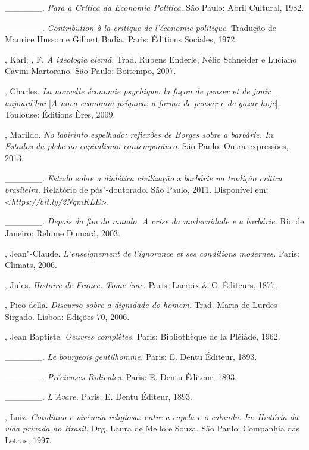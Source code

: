 \begin{Parskip}
\_\_\_\_\_\_. \emph{Para a Crítica da Economia Política}. São Paulo:
Abril Cultural, 1982.

\_\_\_\_\_\_. \emph{Contribution à la critique de l'économie
politique}. Tradução de Maurice Husson e Gilbert Badia. Paris: Éditions
Sociales, 1972.

, Karl; , F. \emph{A ideologia alemã.} Trad. Rubens Enderle,
Nélio Schneider e Luciano Cavini Martorano. São Paulo: Boitempo, 2007.

, Charles. \emph{La nouvelle économie psychique: la façon de
penser et de jouir aujourd'hui} [\emph{A nova economia psíquica: a
forma de pensar e de gozar hoje}]. Toulouse: Éditions Ères, 2009.

, Marildo. \emph{No labirinto espelhado: reflexões de Borges
sobre a barbárie. In}: \emph{Estados da plebe no capitalismo
contemporâneo.} São Paulo: Outra expressões, 2013.

\_\_\_\_\_\_. \emph{Estudo sobre a dialética civilização x barbárie na
tradição crítica brasileira.} Relatório de pós"-doutorado. São Paulo,
2011. Disponível em: \textless{}\emph{https://bit.ly/2NqmKLE}\textgreater{}.

\_\_\_\_\_\_. \emph{Depois do fim do mundo. A crise da modernidade e a
barbárie.} Rio de Janeiro: Relume Dumará, 2003.

, Jean"-Claude. \emph{L'enseignement de l'ignorance et ses
conditions modernes.} Paris: Climats, 2006.

, Jules. \emph{Histoire de France. Tome ème.} Paris: Lacroix
\& C. Éditeurs, 1877.

, Pico della. \emph{Discurso sobre a dignidade do homem.}
Trad. Maria de Lurdes Sirgado. Lisboa: Edições 70, 2006.

, Jean Baptiste. \emph{Oeuvres complètes.} Paris: Bibliothèque
de la Pléiâde, 1962.

\_\_\_\_\_\_. \emph{Le bourgeois gentilhomme.} Paris: E. Dentu
Éditeur, 1893.

\_\_\_\_\_\_. \emph{Précieuses Ridicules}. Paris: E. Dentu Éditeur,
1893.

\_\_\_\_\_\_. \emph{L'Avare.} Paris: E. Dentu Éditeur, 1893.

, Luiz. \emph{Cotidiano e vivência religiosa: entre a capela e o
calundu.} \emph{In}: \emph{História da vida privada no Brasil.} Org.
Laura de Mello e Souza. São Paulo: Companhia das Letras, 1997.


\end{Parskip}
